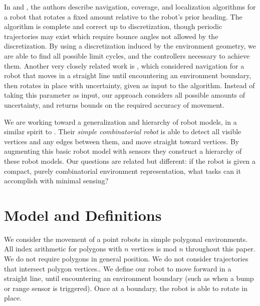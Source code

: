 \documentclass[]{styles/svproc}  %
\begin{document}
In \cite{alam2017minimalist} and \cite{alam2018space}, the authors describe
navigation, coverage, and localization algorithms for a robot that rotates a fixed amount 
relative to the robot's prior heading. The
algorithm is complete and correct up to discretization, though periodic
trajectories may exist which require bounce angles not allowed by the
discretization. By using a discretization induced by the environment geometry,
we are able to find all possible limit cycles, and the controllers necessary to
achieve them.
Another very closely related work is \cite{LewOKa13}, which considered
navigation for a robot that moves in a straight line until encountering an
environment boundary, then rotates in place with uncertainty, given as input to the
algorithm. Instead of taking this parameter as input, our approach
considers all possible amounts of uncertainty, and returns bounds on the required
accuracy of movement.

We are working toward a generalization and hierarchy of robot models, in a
similar spirit to \cite{brunner2008simple}. Their {\em simple
combinatorial robot} is able to detect all visible vertices and any edges
between them, and move straight toward vertices. By augmenting this basic robot model
with sensors they construct a hierarchy of these robot models. Our questions are related but
different: if the robot is given a compact, purely combinatorial environment representation, 
what tasks can it accomplish with minimal sensing?

\section{Model and Definitions}

We consider the movement of a point robots in simple 
polygonal environments. All index arithmetic for polygons with $n$ vertices is mod $n$ 
throughout this paper. We do not require polygons in general position. We do
not consider trajectories that intersect polygon vertices.. We define our robot to move forward in a straight line, until
encountering an environment boundary (such as when a bump or range sensor is
triggered). Once at a boundary, the robot is able to rotate in place.
\end{document}
